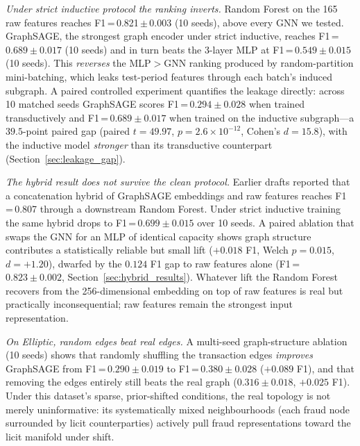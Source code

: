 \textit{Under strict inductive protocol the ranking inverts.}  Random
Forest on the 165 raw features reaches F1\,=\,0.821\,$\pm$\,0.003
(10 seeds), above every GNN we tested.  GraphSAGE, the strongest
graph encoder under strict inductive, reaches
F1\,=\,$0.689 \pm 0.017$ (10 seeds) and in turn beats the 3-layer
MLP at F1\,=\,$0.549 \pm 0.015$ (10 seeds).
This \emph{reverses} the MLP$>$GNN ranking produced by random-partition
mini-batching, which leaks test-period features through each batch's
induced subgraph.  A
paired controlled experiment quantifies the leakage directly:
across 10 matched seeds GraphSAGE scores
F1\,=\,$0.294 \pm 0.028$ when trained transductively and
F1\,=\,$0.689 \pm 0.017$ when trained on the inductive subgraph---a
$39.5$-point paired gap (paired $t = 49.97$, $p = 2.6 \times 10^{-12}$,
Cohen's $d = 15.8$), with the inductive model \emph{stronger} than
its transductive counterpart (Section~\ref{sec:leakage_gap}).

\textit{The hybrid result does not survive the clean protocol.}
Earlier drafts reported that a concatenation hybrid of GraphSAGE
embeddings and raw features reaches F1\,=\,0.807 through a
downstream Random Forest.  Under strict inductive training the same
hybrid drops to F1\,=\,$0.699 \pm 0.015$ over 10 seeds.  A paired
ablation that swaps the GNN for an MLP of identical capacity shows
graph structure contributes a statistically reliable but small lift
($+0.018$ F1, Welch $p = 0.015$, $d = +1.20$), dwarfed by the
$0.124$ F1 gap to raw features alone (F1\,=\,$0.823 \pm 0.002$,
Section~\ref{sec:hybrid_results}).  Whatever lift the Random Forest
recovers from the 256-dimensional embedding on top of raw features
is real but practically inconsequential; raw features remain the
strongest input representation.

\textit{On Elliptic, random edges beat real edges.}  A multi-seed
graph-structure ablation (10 seeds) shows that randomly shuffling
the transaction edges \emph{improves} GraphSAGE from
F1\,=\,$0.290 \pm 0.019$ to F1\,=\,$0.380 \pm 0.028$
($+0.089$ F1), and that removing the edges entirely still beats
the real graph ($0.316 \pm 0.018$, $+0.025$ F1).  Under this
dataset's sparse, prior-shifted conditions, the real topology is
not merely uninformative: its systematically mixed neighbourhoods
(each fraud node surrounded by licit counterparties) actively pull
fraud representations toward the licit manifold under shift.

